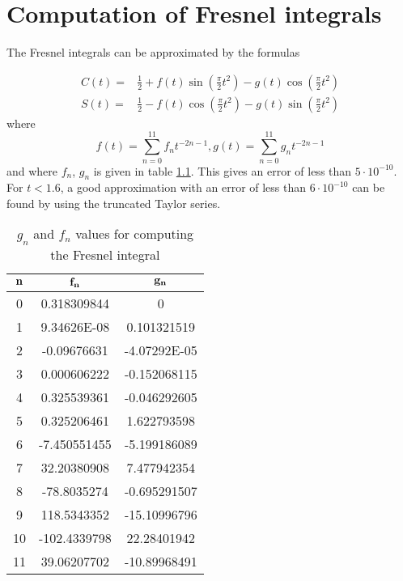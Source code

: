 \chapter{Computation of Fresnel integrals}
\label{app:fresnel}

The Fresnel integrals can be approximated by the formulas

\begin{align*}
C(t) =& \frac{1}{2} + f(t)\sin\left(\frac{\pi}{2}t^2\right) - g(t)\cos\left(\frac{\pi}{2}t^2\right)\\
S(t) =& \frac{1}{2} - f(t)\cos\left(\frac{\pi}{2}t^2\right) - g(t)\sin\left(\frac{\pi}{2}t^2\right)
\end{align*}
where
$$
f(t) = \sum_{n=0}^{11} f_nt^{-2n-1}, g(t) = \sum_{n=0}^{11} g_nt^{-2n-1}
$$
and where $f_n$, $g_n$ is given in table \ref{tab:fresnel}. This gives an error of less than $5\cdot 10^{-10}$. For $t < 1.6$, a good approximation with an error of less than $6\cdot 10^{-10}$ can be found by using the truncated Taylor series.\cite{fresnel}

\begin{table}[ht]
\centering
\begin{tabular}{ccc}
\hline
$\mathbf{n}$ & $\mathbf{f_n}$ & $\mathbf{g_n}$\\
\hline
0  &  0.318309844  &  0\\
1  &  9.34626E-08  &  0.101321519\\
2  &  -0.09676631  &  -4.07292E-05\\
3  &  0.000606222  &  -0.152068115\\
4  &  0.325539361  &  -0.046292605\\
5  &  0.325206461  &  1.622793598\\
6  &  -7.450551455 &  -5.199186089\\
7  &  32.20380908  &  7.477942354\\
8  &  -78.8035274  &  -0.695291507\\
9  &  118.5343352  &  -15.10996796\\
10 &  -102.4339798 &  22.28401942\\
11 &  39.06207702  &  -10.89968491\\
\hline
\end{tabular}
\caption{$g_n$ and $f_n$ values for computing the Fresnel integral}
\label{tab:fresnel}
\end{table}
